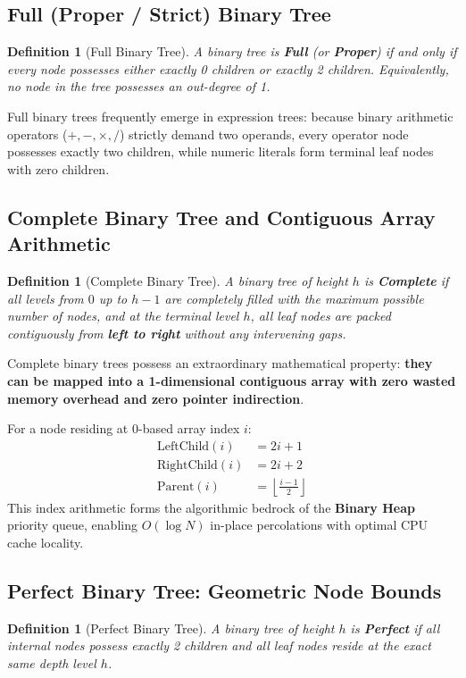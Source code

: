\documentclass[10pt,journal,compsoc,onecolumn]{IEEEtran}
\newtheorem{definition}[theorem]{Definition}
\begin{document}
\subsection{Full (Proper / Strict) Binary Tree}
\begin{definition}[Full Binary Tree]
A binary tree is \textbf{Full} (or \textbf{Proper}) if and only if every node possesses either exactly 0 children or exactly 2 children. Equivalently, no node in the tree possesses an out-degree of 1.
\end{definition}

Full binary trees frequently emerge in expression trees: because binary arithmetic operators ($+, -, \times, /$) strictly demand two operands, every operator node possesses exactly two children, while numeric literals form terminal leaf nodes with zero children.

\subsection{Complete Binary Tree and Contiguous Array Arithmetic}
\begin{definition}[Complete Binary Tree]
A binary tree of height $h$ is \textbf{Complete} if all levels from $0$ up to $h - 1$ are completely filled with the maximum possible number of nodes, and at the terminal level $h$, all leaf nodes are packed contiguously from \textbf{left to right} without any intervening gaps.
\end{definition}

Complete binary trees possess an extraordinary mathematical property: \textbf{they can be mapped into a 1-dimensional contiguous array with zero wasted memory overhead and zero pointer indirection}. 

For a node residing at 0-based array index $i$:
\begin{align}
    \mathrm{LeftChild}(i) &= 2i + 1 \\
    \mathrm{RightChild}(i) &= 2i + 2 \\
    \mathrm{Parent}(i) &= \left\lfloor \frac{i - 1}{2} \right\rfloor
\end{align}
This index arithmetic forms the algorithmic bedrock of the \textbf{Binary Heap} priority queue, enabling $O(\log N)$ in-place percolations with optimal CPU cache locality.

\subsection{Perfect Binary Tree: Geometric Node Bounds}
\begin{definition}[Perfect Binary Tree]
A binary tree of height $h$ is \textbf{Perfect} if all internal nodes possess exactly 2 children and all leaf nodes reside at the exact same depth level $h$.
\end{definition}
\end{document}
